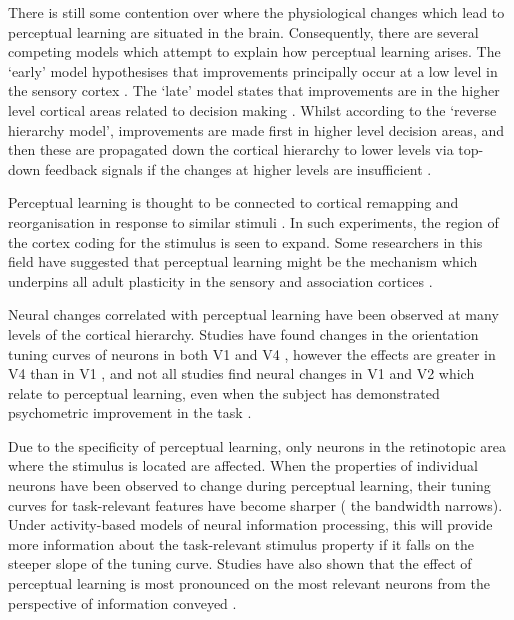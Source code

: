 There is still some contention over where the physiological changes which lead to perceptual learning are situated in the brain.
Consequently, there are several competing models which attempt to explain how perceptual learning arises.
The `early' model hypothesises that improvements principally occur at a low level in the sensory cortex \citep{Gilbert2001,Fahle2005}.
The `late' model states that improvements are in the higher level cortical areas related to decision making \citep{Yu2004}.
Whilst according to the `reverse hierarchy model', improvements are made first in higher level decision areas, and then these are propagated down the cortical hierarchy to lower levels via top-down feedback signals if the changes at higher levels are insufficient \citep{Ahissar2004,Hochstein2002}.


Perceptual learning is thought to be connected to cortical remapping and reorganisation in response to similar stimuli \citep{Dinse2003,Pleger2003,Polley2006}.
In such experiments, the region of the cortex coding for the stimulus is seen to expand.
Some researchers in this field have suggested that perceptual learning might be the mechanism which underpins all adult plasticity in the sensory and association cortices \citep{Gilbert2001}.


Neural changes correlated with perceptual learning have been observed at many levels of the cortical hierarchy.
Studies have found changes in the orientation tuning curves of neurons in both \ac{V1} \citep{Schoups2001} and \ac{V4} \citep{Li2004,Yang2004,Raiguel2006}, however the effects are greater in \ac{V4} than in \ac{V1} \citep{Raiguel2006}, and not all studies find neural changes in \ac{V1} and \ac{V2} which relate to perceptual learning, even when the subject has demonstrated psychometric improvement in the task \citep{Ghose2002}.

Due to the specificity of perceptual learning, only neurons in the retinotopic area where the stimulus is located are affected.
When the properties of individual neurons have been observed to change during perceptual learning, their tuning curves for task-relevant features have become sharper (\ie{} the bandwidth narrows).
Under activity-based models of neural information processing, this will provide more information about the task-relevant stimulus property if it falls on the steeper slope of the tuning curve.
Studies have also shown that the effect of perceptual learning is most pronounced on the most relevant neurons from the perspective of information conveyed \citep{Raiguel2006}.


